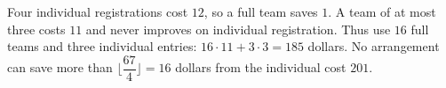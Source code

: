 Four individual registrations cost $12$, so a full team saves $1$. A team of at most three costs $11$ and never improves on individual registration. Thus use $16$ full teams and three individual entries: $16\cdot11+3\cdot3=\boxed{185}$ dollars. No arrangement can save more than $\lfloor\dfrac{67}{4}\rfloor=16$ dollars from the individual cost $201$.
